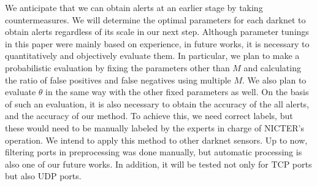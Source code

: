 \documentclass[letterpaper]{sig-alternate-10pt}
\begin{document}
We anticipate that we can obtain alerts at an earlier stage by taking countermeasures.
We will determine the optimal parameters for each darknet to obtain alerts regardless of its scale in our next step.
Although parameter tunings in this paper were mainly based on experience, in future works, it is necessary to quantitatively and objectively evaluate them.
In particular, we plan to make a probabilistic evaluation by fixing the parameters other than $M$ and calculating the ratio of false positives and false negatives using multiple $M$.
We also plan to evaluate $\theta$ in the same way with the other fixed parameters as well.
On the basis of such an evaluation, it is also necessary to obtain the accuracy of the all alerts, and the accuracy of our method.
To achieve this, we need correct labels, but these would need to be manually labeled by the experts in charge of NICTER's operation.
We intend to apply this method to other darknet sensors.
Up to now, filtering ports in preprocessing was done manually, but automatic processing is also one of our future works.
In addition, it will be tested not only for TCP ports but also UDP ports.


\end{document}
